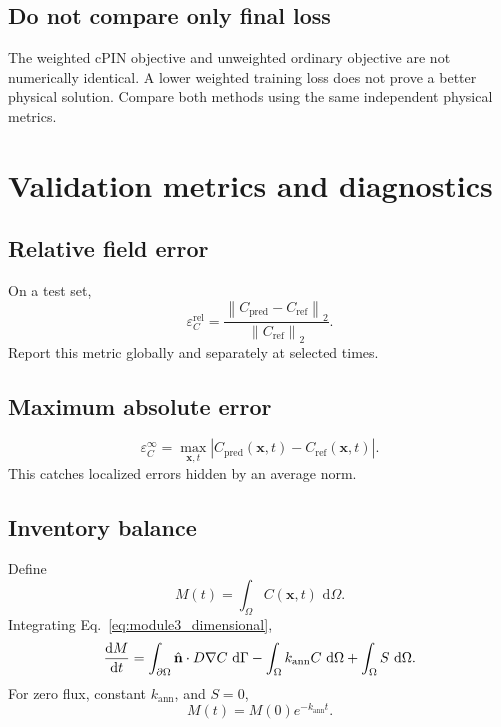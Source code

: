 \documentclass[11pt]{article}
\newcommand{\xv}{\bm{x}}
\newcommand{\Norm}[1]{\left\lVert #1 \right\rVert}
\newcommand{\Om}{\Omega}
\providecommand{\dd}{\,\mathrm{d}}
\begin{document}
\subsection{Do not compare only final loss}

The weighted cPIN objective and unweighted ordinary objective are not numerically identical. A lower weighted training loss does not prove a better physical solution. Compare both methods using the same independent physical metrics.

\section{Validation metrics and diagnostics}

\subsection{Relative field error}

On a test set,
\begin{equation}
\varepsilon_C^{\mathrm{rel}}
=
\frac{
\Norm{C_{\mathrm{pred}}-C_{\mathrm{ref}}}_2
}{
\Norm{C_{\mathrm{ref}}}_2
}.
\label{eq:relative_error}
\end{equation}
Report this metric globally and separately at selected times.

\subsection{Maximum absolute error}

\begin{equation}
\varepsilon_C^{\infty}
=
\max_{\xv,t}
\left|
C_{\mathrm{pred}}(\xv,t)-C_{\mathrm{ref}}(\xv,t)
\right|.
\end{equation}
This catches localized errors hidden by an average norm.

\subsection{Inventory balance}

Define
\begin{equation}
M(t)=\int_{\Om}C(\xv,t)\,\dd\Om.
\end{equation}
Integrating Eq.~\eqref{eq:module3_dimensional},
\begin{equation}
\dv{M}{t}
=
\int_{\partial\Om}
\hat{\mathbf n}\cdot D\nabla C\,\dd\Gamma
-\int_{\Om}k_{\mathrm{ann}}C\,\dd\Om
+\int_{\Om}S\,\dd\Om.
\label{eq:inventory_balance}
\end{equation}
For zero flux, constant $k_{\mathrm{ann}}$, and $S=0$,
\begin{equation}
M(t)=M(0)e^{-k_{\mathrm{ann}}t}.
\label{eq:inventory_exact}
\end{equation}
\end{document}
